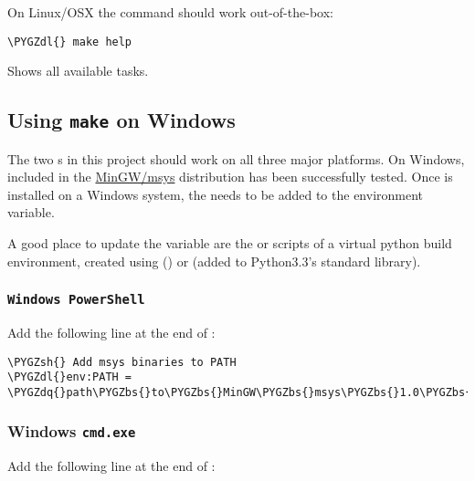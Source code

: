\documentclass[letterpaper,10pt,english]{sphinxmanual}
\def\PYGZbs{\char`\\}
\def\PYGZsh{\char`\#}
\def\PYGZdl{\char`\$}
\def\PYGZdq{\char`\"}
\begin{document}
On Linux/OSX the  command should work out-of-the-box:

\begin{Verbatim}[commandchars=\\\{\}]
\PYGZdl{} make help
\end{Verbatim}

Shows all available tasks.


\subsection{Using \texttt{make} on Windows}
\label{make_info:using-make-on-windows}
The two  s in this project should work on all three major platforms.
On Windows,  included in the \href{http://sourceforge.net/projects/mingw/files/Installer/mingw-get-setup.exe/download}{MinGW/msys}
distribution has been successfully tested. Once  is installed
on a Windows system, the  needs to be added to
the  environment variable.

A good place to update the  variable are the  or
 scripts of a virtual python build environment, created using
 () or  (added to Python3.3's standard
library).


\subsubsection{\texttt{Windows PowerShell}}
\label{make_info:windows-powershell}
Add the following line at the end of :

\begin{Verbatim}[commandchars=\\\{\}]
\PYGZsh{} Add msys binaries to PATH
\PYGZdl{}env:PATH = \PYGZdq{}path\PYGZbs{}to\PYGZbs{}MinGW\PYGZbs{}msys\PYGZbs{}1.0\PYGZbs{}bin;\PYGZdl{}env:PATH\PYGZdq{}
\end{Verbatim}


\subsubsection{Windows \texttt{cmd.exe}}
\label{make_info:windows-cmd-exe}
Add the following line at the end of :
\end{document}
